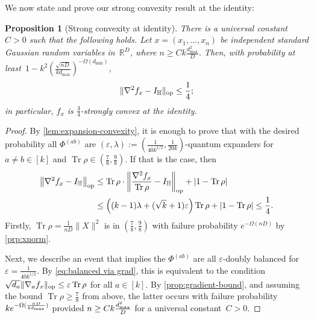 \documentclass[aos]{imsart}
\newtheorem{prop}[theorem]{Proposition}
\theoremstyle{definition}
\numberwithin{equation}{section}
\DeclareMathOperator{\op}{op}
\DeclareMathOperator{\tr}{Tr}
\DeclarePairedDelimiter{\abs}{\lvert}{\rvert}
\DeclarePairedDelimiter{\norm}{\lVert}{\rVert}
\newcommand{\R}{{\mathbb{R}}}
\renewcommand{\H}{{\mathbb{H}}}
\newcommand{\eps}{\varepsilon}
\newcommand{\rv}{x}
\def\dmin{d_{\min}}
\def\dmax{d_{\max}}
\begin{document}
We now state and prove our strong convexity result at the identity:

\begin{prop}[Strong convexity at identity]\label{thm:tensor-convexity}
There is a universal constant $C>0$ such that the following holds.
Let $x = (x_1,\dots,x_n)$ be independent standard Gaussian random variables in~$\R^D$, where $n \geq C k \frac{\dmax^2}D$.
Then, with probability at least~$1 - k^2 ( \frac{\sqrt{nD}}{k \dmax} )^{-\Omega(\dmin)}$,
\begin{align*}
  \norm{\nabla^2 f_x - I_\H}_{\op} \leq \frac14;
\end{align*}
in particular, $f_x$ is $\frac34$-strongly convex at the identity.
\end{prop}
\begin{proof}
By \cref{lem:expansion-convexity}, it is enough to prove that with the desired probability all $\Phi^{(ab)}$ are $(\eps,\lambda):=(\frac1{40 k^{1/2}},\frac1{20k})$-quantum expanders for $a\neq b\in[k]$ and $\tr \rho \in (\frac78,\frac98)$.
If that is the case, then
\begin{align*}
  \norm*{\nabla^2 f_x - I_\H}_{\op}
&\leq \tr \rho \cdot  \norm*{\frac{\nabla^2 f_x}{\tr \rho} - I_\H}_{\op}  + \abs{1 - \tr\rho} \\
&\leq \left( (k-1)\lambda + (\sqrt k + 1) \eps \right) \tr\rho + \abs{1 - \tr\rho}
\leq \frac14.
\end{align*}
Firstly, $\tr \rho = \frac{1}{nD} \|X\|^2$ is in $(\frac78, \frac98)$ with failure probability $e^{-\Omega(nD)}$ by \cref{prp:xnorm}.

Next, we describe an event that implies the $\Phi^{(ab)}$ are all $\eps$-doubly balanced for $\eps=\frac1{40k^{1/2}}$.
By \cref{eq:balanced via grad}, this is equivalent to the condition $\sqrt{d_a} \norm{\nabla_a f_{\rv}}_{\op} \leq \eps \tr \rho$ for all $a \in [k]$.
By \cref{prop:gradient-bound}, and assuming the bound $\tr \rho \geq \frac78$ from above, the latter occurs with failure probability~$k \smash{e^{-\Omega(\frac{nD}{k \dmax})}}$ provided $n \geq C k \smash{\frac{\dmax^2}D}$ for a universal constant~$C>0$.


\end{proof}
\end{document}
